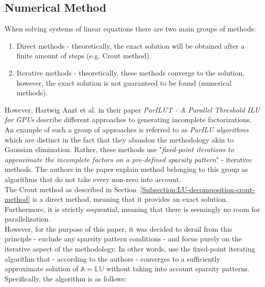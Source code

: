 \subsection{Numerical Method}\label{Subsection:LU-decomposition-numerical-method}
When solving systems of linear equations there are two main groups of methods:

\begin{enumerate}
	\item Direct methods - theoretically, the exact solution will be obtained after a finite amount of steps (e.g. Crout method).
	\item Iterative methods - theoretically, these methods converge to the solution, however, the exact solution is not guaranteed to be found (numerical methods).
\end{enumerate}

However, Hartwig Anzt et al. in their paper \emph{ParILUT - A Parallel Threshold ILU for GPUs} \cite{Anzt2019} describe different approaches to generating incomplete factorizations. An example of such a group of approaches is referred to as \textit{ParILU algorithms} which are distinct in the fact that they abandon the methodology akin to Gaussian elimination. Rather, these methods use "\textit{fixed-point iterations to approximate the incomplete factors on a pre-defined sparsity pattern}" - iterative methods. The authors in the paper explain method belonging to this group as algorithms that do not take every non-zero into account. \\
The Crout method as described in Section~\ref{Subsection:LU-decomposition-crout-method} is a direct method, meaning that it provides an exact solution. Furthermore, it is strictly sequential, meaning that there is seemingly no room for parallelization. \\
However, for the purpose of this paper, it was decided to derail from this principle - exclude any sparsity pattern conditions - and focus purely on the iterative aspect of the methodology. In other words, use the fixed-point iterating algorithm that - according to the authors - converges to a sufficiently approximate solution of $ \mathbb{A} = \mathbb{LU} $ without taking into account sparsity patterns. \\
Specifically, the algorithm is as follows:

